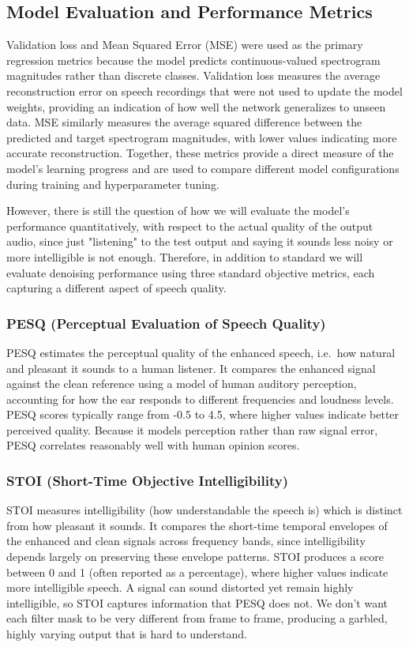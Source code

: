 \documentclass[11pt, letterpaper,titlepage]{article}
\begin{document}
\subsection{Model Evaluation and Performance Metrics}
Validation loss and Mean Squared Error (MSE) were used as the primary regression metrics because the model predicts continuous-valued spectrogram magnitudes rather than discrete classes. Validation loss measures the average reconstruction error on speech recordings that were not used to update the model weights, providing an indication of how well the network generalizes to unseen data. MSE similarly measures the average squared difference between the predicted and target spectrogram magnitudes, with lower values indicating more accurate reconstruction. Together, these metrics provide a direct measure of the model's learning progress and are used to compare different model configurations during training and hyperparameter tuning.



However, there is still the question of how we will evaluate the model's performance quantitatively, with respect to the actual quality of the output audio, since just "listening" to the test output and saying it sounds less noisy or more intelligible is not enough. Therefore, in addition to standard we will evaluate denoising performance using three standard objective metrics, each capturing a different aspect of speech quality.

\subsubsection*{PESQ (Perceptual Evaluation of Speech Quality)}
PESQ estimates the perceptual quality of the enhanced speech,
i.e.\ how natural and pleasant it sounds to a human listener. It
compares the enhanced signal against the clean reference using a model
of human auditory perception, accounting for how the ear responds to
different frequencies and loudness levels. PESQ scores typically range
from -0.5 to 4.5, where higher values indicate better perceived
quality. Because it models perception rather than raw signal error,
PESQ correlates reasonably well with human opinion scores.

\subsubsection*{STOI (Short-Time Objective Intelligibility)}
STOI measures intelligibility (how understandable the speech
is) which is distinct from how pleasant it sounds. It compares the
short-time temporal envelopes of the enhanced and clean signals across
frequency bands, since intelligibility depends largely on preserving
these envelope patterns. STOI produces a score between 0 and 1
(often reported as a percentage), where higher values indicate more
intelligible speech. A signal can sound distorted yet remain highly
intelligible, so STOI captures information that PESQ does not. We don't want each filter mask to be very different from frame to frame, producing a garbled, highly varying output that is hard to understand.
\end{document}
